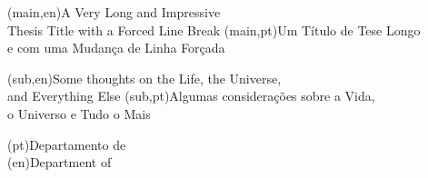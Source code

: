 
%


\nttitle(main,en){A Very Long and Impressive\\Thesis Title with a Forced Line Break}%
\nttitle(main,pt){Um Título de Tese Longo\\e com uma Mudança de Linha Forçada}%

\nttitle(sub,en){Some thoughts on the Life, the Universe,\\and Everything Else}%
\nttitle(sub,pt){Algumas considerações sobre a Vida,\\o Universo e Tudo o Mais}%

\ntdepartment(pt){Departamento de\\}
\ntdepartment(en){Department of\\}

